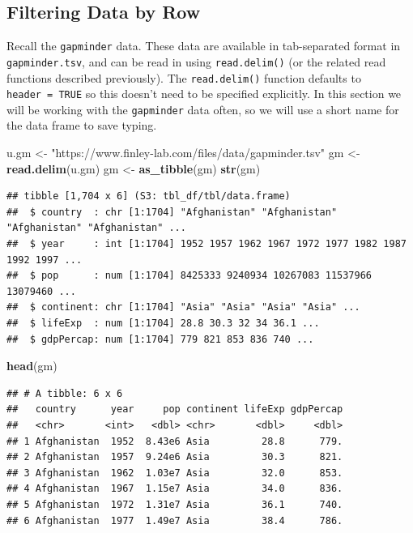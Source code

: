 \documentclass[
]{krantz}
\newenvironment{Shaded}{\begin{snugshade}}{\end{snugshade}}
\newcommand{\KeywordTok}[1]{\textcolor[rgb]{0.13,0.29,0.53}{\textbf{#1}}}
\newcommand{\NormalTok}[1]{#1}
\newcommand{\StringTok}[1]{\textcolor[rgb]{0.31,0.60,0.02}{#1}}
\begin{document}
\hypertarget{filtering-data-by-row}{%
\subsection{Filtering Data by Row}\label{filtering-data-by-row}}

Recall the \texttt{gapminder} data. These data are available in tab-separated format in \texttt{gapminder.tsv}, and can be read in using \texttt{read.delim()} (or the related read functions described previously). The \texttt{read.delim()} function defaults to \texttt{header\ =\ TRUE} so this doesn't need to be specified explicitly. In this section we will be working with the \texttt{gapminder} data often, so we will use a short name for the data frame to save typing.

\begin{Shaded}
\begin{Highlighting}[]
\NormalTok{u.gm \textless{}{-}}\StringTok{ "https://www.finley{-}lab.com/files/data/gapminder.tsv"}
\NormalTok{gm \textless{}{-}}\StringTok{ }\KeywordTok{read.delim}\NormalTok{(u.gm)}
\NormalTok{gm \textless{}{-}}\StringTok{ }\KeywordTok{as\_tibble}\NormalTok{(gm)}
\KeywordTok{str}\NormalTok{(gm)}
\end{Highlighting}
\end{Shaded}

\begin{verbatim}
## tibble [1,704 x 6] (S3: tbl_df/tbl/data.frame)
##  $ country  : chr [1:1704] "Afghanistan" "Afghanistan" "Afghanistan" "Afghanistan" ...
##  $ year     : int [1:1704] 1952 1957 1962 1967 1972 1977 1982 1987 1992 1997 ...
##  $ pop      : num [1:1704] 8425333 9240934 10267083 11537966 13079460 ...
##  $ continent: chr [1:1704] "Asia" "Asia" "Asia" "Asia" ...
##  $ lifeExp  : num [1:1704] 28.8 30.3 32 34 36.1 ...
##  $ gdpPercap: num [1:1704] 779 821 853 836 740 ...
\end{verbatim}

\begin{Shaded}
\begin{Highlighting}[]
\KeywordTok{head}\NormalTok{(gm)}
\end{Highlighting}
\end{Shaded}

\begin{verbatim}
## # A tibble: 6 x 6
##   country      year     pop continent lifeExp gdpPercap
##   <chr>       <int>   <dbl> <chr>       <dbl>     <dbl>
## 1 Afghanistan  1952  8.43e6 Asia         28.8      779.
## 2 Afghanistan  1957  9.24e6 Asia         30.3      821.
## 3 Afghanistan  1962  1.03e7 Asia         32.0      853.
## 4 Afghanistan  1967  1.15e7 Asia         34.0      836.
## 5 Afghanistan  1972  1.31e7 Asia         36.1      740.
## 6 Afghanistan  1977  1.49e7 Asia         38.4      786.
\end{verbatim}
\end{document}
